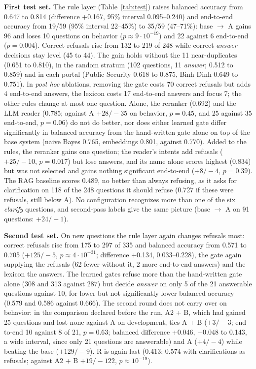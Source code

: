 \textbf{First test set.} The rule layer (Table~\ref{tab:test}) raises balanced accuracy from 0.647 to 0.814 (difference +0.167, 95\% interval
0.095--0.240) and end-to-end accuracy from 19/59 (95\% interval 22--45\%) to 35/59 (47--71\%): base $\rightarrow$ A gains 96 and loses 10 questions on behavior
($p\approx 9\cdot10^{-19}$) and 22 against 6 end-to-end ($p=0.004$). Correct refusals rise from 132 to 219 of 248 while correct
\emph{answer} decisions stay level (45 to 44). The gain holds without the 11 near-duplicates (0.651 to 0.810), in the random stratum (102 questions,
11 \emph{answer}; 0.512 to 0.859) and in each portal (Public Security 0.618 to 0.875, Binh Dinh 0.649 to 0.751). In \emph{post hoc}
ablations, removing the gate costs 70 correct refusals but adds 4 end-to-end answers, the lexicon costs 17 end-to-end answers and focus 7;
the other rules change at most one question. Alone, the reranker (0.692) and the LLM reader (0.785; against A $+28/{-}35$ on behavior,
$p=0.45$, and 25 against 35 end-to-end, $p=0.06$) do not do better, nor does either learned gate differ significantly in balanced
accuracy from the hand-written gate alone on top of the base system (naive Bayes 0.765, embeddings 0.801, against 0.770). Added to the rules, the reranker
gains one question; the reader's intents add refusals ($+25/{-}10$, $p=0.017$) but lose answers, and its name alone scores highest (0.834)
but was not selected and gains nothing significant end-to-end ($+8/{-}4$, $p=0.39$). The RAG baseline scores 0.489, no better than always refusing,
as it asks for clarification on 118 of the 248 questions it should refuse (0.727 if these were refusals, still below A). No configuration
recognizes more than one of the six \emph{clarify} questions, and second-pass labels give the same picture (base $\rightarrow$ A on 91
questions: $+24/{-}1$).

\textbf{Second test set.} On new questions the rule layer again changes refusals most: correct refusals rise from 175 to 297 of 335 and
balanced accuracy from 0.571 to 0.705 ($+125/{-}5$, $p\approx 4\cdot10^{-31}$; difference +0.134, 0.033--0.228), the gate again supplying the refusals (62 fewer without it, 2 more end-to-end
answers) and the lexicon the answers. The learned gates refuse more than the hand-written gate alone (308 and 313 against 287) but decide
\emph{answer} on only 5 of the 21 answerable questions against 10, for lower but not significantly lower balanced accuracy (0.579 and
0.586 against 0.666). The second round does not carry over on behavior: in the comparison declared before the run, A2 + B, which had gained 25
questions and lost none against A on development, ties A + B ($+3/{-}3$; end-to-end 10 against 8 of 21, $p=0.63$; balanced difference
+0.046, $-0.048$ to 0.143, a wide interval, since only 21 questions are answerable) and A ($+4/{-}4$) while beating the base
($+129/{-}9$). R is again last (0.413; 0.574 with clarifications as refusals; against A2 + B $+19/{-}122$, $p\approx 10^{-19}$).


